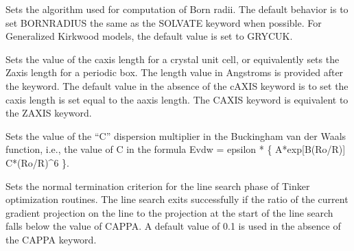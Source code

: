 \documentclass[letterpaper,11pt,english]{sphinxmanual}
\begin{document}
\ignorespaces {}\label{\detokenize{text/keywords:key-born-radius}}\begin{description}
\sphinxAtStartPar
Sets the algorithm used for computation of Born radii. The default behavior is to set BORN\sphinxhyphen{}RADIUS the same as the SOLVATE keyword when possible. For Generalized Kirkwood models, the default value is set to GRYCUK.

\end{description}

\ignorespaces {}\label{\detokenize{text/keywords:key-c-axis}}\begin{description}
\sphinxAtStartPar
Sets the value of the c\sphinxhyphen{}axis length for a crystal unit cell, or equivalently sets the Z\sphinxhyphen{}axis length for a periodic box. The length value in Angstroms is provided after the keyword. The default value in the absence of the c\sphinxhyphen{}AXIS keyword is to set the c\sphinxhyphen{}axis length is set equal to the a\sphinxhyphen{}axis length. The C\sphinxhyphen{}AXIS keyword is equivalent to the Z\sphinxhyphen{}AXIS keyword.

\end{description}

\ignorespaces {}\label{\detokenize{text/keywords:key-c-expterm}}\begin{description}
\sphinxAtStartPar
Sets the value of the “C” dispersion multiplier in the Buckingham van der Waals function, i.e., the value of C in the formula Evdw = epsilon * \{ A*exp{[}\sphinxhyphen{}B(Ro/R){]} \sphinxhyphen{} C*(Ro/R)\textasciicircum{}6 \}.

\end{description}

\ignorespaces {}\label{\detokenize{text/keywords:key-cappa}}\begin{description}
\sphinxAtStartPar
Sets the normal termination criterion for the line search phase of Tinker optimization routines. The line search exits successfully if the ratio of the current gradient projection on the line to the projection at the start of the line search falls below the value of CAPPA. A default value of 0.1 is used in the absence of the CAPPA keyword.

\end{description}
\end{document}
